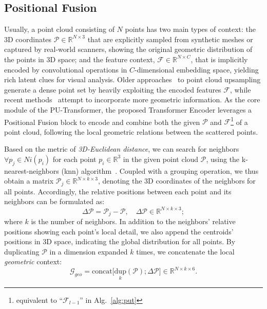 \subsection{Positional Fusion}
\label{sec:posfus}
Usually, a point cloud consisting of $N$ points has two main types of context: the 3D coordinates $\mathcal{P}\in\mathbb{R}^{N\times3}$ that are explicitly sampled from synthetic meshes or captured by real-world scanners, showing the original geometric distribution of the points in 3D space; and the feature context, $\mathcal{F}\in\mathbb{R}^{N\times C}$, that is implicitly encoded by convolutional operations in $C$-dimensional embedding space, yielding rich latent clues for visual analysis. Older approaches~\cite{yu2018pu,yifan2019patch,li2019pu} to point cloud upsampling generate a dense point set by heavily exploiting the encoded features $\mathcal{F}$, while recent methods~\cite{qian2020pugeo,qian2021pu} attempt to incorporate more geometric information. As the core module of the PU-Transformer, the proposed Transformer Encoder leverages a Positional Fusion block to encode and combine both the given $\mathcal{P}$ and $\mathcal{F}$\footnote{equivalent to \enquote{$\mathcal{F}_{l-1}$} in Alg.~\ref{alg:put}} of a point cloud, following the local geometric relations between the scattered points.

Based on the metric of \emph{3D-Euclidean distance}, we can search for neighbors ${\forall}p_j\in Ni(p_i)$ for each point $p_i\in\mathbb{R}^{3}$ in the given point cloud $\mathcal{P}$, using the k-nearest-neighbors (knn) algorithm~\cite{wang2019dynamic}. Coupled with a grouping operation, we thus obtain a matrix $\mathcal{P}_j\in\mathbb{R}^{N\times k \times3}$, denoting the 3D coordinates of the neighbors for all points. Accordingly, the relative positions between each point and its neighbors can be formulated as:
\begin{equation}
\label{equ:1}
    \Delta\mathcal{P} = \mathcal{P}_j - \mathcal{P}, \quad \Delta\mathcal{P}\in\mathbb{R}^{N\times k \times3};
\end{equation}
where $k$ is the number of neighbors. In addition to the neighbors' relative positions showing each point's local detail, we also append the centroids' positions in 3D space, indicating the global distribution for all points. By duplicating $\mathcal{P}$ in a dimension expanded $k$ times, we concatenate the local \emph{geometric} context:
\begin{equation}
\label{equ:2}
    \mathcal{G}_{geo} = \mathrm{concat}\big[\underset{k}{\mathrm{dup}}(\mathcal{P}); \Delta\mathcal{P}\big]\in\mathbb{R}^{N\times k \times6}.
\end{equation}

